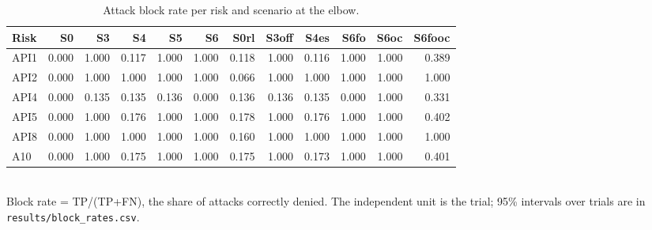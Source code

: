 \begin{table}[t]
\centering
\caption{Attack block rate per risk and scenario at the elbow.}
\label{tab:blockrates}
\small
\begin{tabular}{lrrrrrrrrrrr}
\toprule
Risk & S0 & S3 & S4 & S5 & S6 & S0rl & S3off & S4es & S6fo & S6oc & S6fooc \\
\midrule
API1 & 0.000 & 1.000 & 0.117 & 1.000 & 1.000 & 0.118 & 1.000 & 0.116 & 1.000 & 1.000 & 0.389 \\
API2 & 0.000 & 1.000 & 1.000 & 1.000 & 1.000 & 0.066 & 1.000 & 1.000 & 1.000 & 1.000 & 1.000 \\
API4 & 0.000 & 0.135 & 0.135 & 0.136 & 0.000 & 0.136 & 0.136 & 0.135 & 0.000 & 1.000 & 0.331 \\
API5 & 0.000 & 1.000 & 0.176 & 1.000 & 1.000 & 0.178 & 1.000 & 0.176 & 1.000 & 1.000 & 0.402 \\
API8 & 0.000 & 1.000 & 1.000 & 1.000 & 1.000 & 0.160 & 1.000 & 1.000 & 1.000 & 1.000 & 1.000 \\
A10 & 0.000 & 1.000 & 0.175 & 1.000 & 1.000 & 0.175 & 1.000 & 0.173 & 1.000 & 1.000 & 0.401 \\
\bottomrule
\end{tabular}
\\[2pt]\footnotesize Block rate = TP/(TP+FN), the share of attacks correctly denied. The independent unit is the trial; 95\% intervals over trials are in \texttt{results/block\_rates.csv}.
\end{table}
